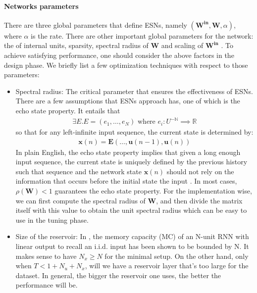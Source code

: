 \documentclass[a4paper,11pt,oneside]{article}
\begin{document}
 \paragraph{Networks parameters} There are three global parameters that define ESNs, namely $(\mathbf{W^{in}, W}, \alpha )$, where $\alpha $ is the rate. There are other important global parameters for the network: the of internal units, sparsity, spectral radius of $\mathbf{W}$ and scaling of $\mathbf{W^{in}}$ \cite{lukovsevivcius2012practical}. To achieve satisfying performance, one should consider the above factors in the design phase. We briefly list a few optimization techniques with respect to those parameters:
 \begin{itemize}
 	\item Spectral radius: The critical parameter that ensures the effectiveness of ESNs. There are a few assumptions that ESNs approach has, one of which is the echo state property. It entails that 
 	\begin{align}
 	\exists E. E = (e_1, \dots, e_N) \text{ where } e_i : U^{-\mathbb{N}} \implies \mathbb{R} 
 	\end{align}
 	so that for any left-infinite input sequence, the current state is determined by:
 	\begin{align}
	\mathbf{x}(n) = \textbf{E}(\dots, \textbf{u}(n - 1), \textbf{u}(n))
 	\end{align}
 	In plain English, the echo state property implies that given a long enough input sequence, the current state is uniquely defined by the previous history such that sequence and the network state $\mathbf{x}(n)$ should not rely on the information that occurs before the initial state the input \cite{jaeger2001echo}. In most cases, $\rho(\mathbf{W}) < 1$ guarantees the echo state property. For the implementation wise, we can first compute the spectral radius of $\mathbf{W}$, and then divide the matrix itself with this value to obtain the unit spectral radius which can be easy to use in the tuning phase.
 	
 	\item Size of the reservoir: In \cite{jaeger2001short}, the memory capacity (MC)   of an N-unit RNN with linear output to recall an i.i.d. input has been shown to be bounded by N. It makes sense to have $N_x \geq N$ for the minimal setup. On the other hand, only when $T < 1 + N_u + N_x$, will we have a reservoir layer that's too large for the dataset. In general, the bigger the reservoir one uses, the better the performance will be. 
 	 	

\end{itemize}
\end{document}
